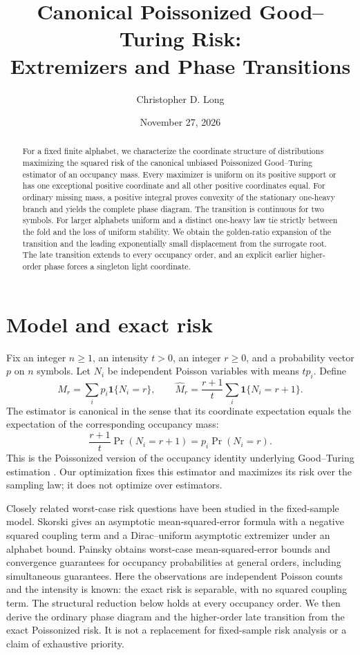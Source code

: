 \documentclass[11pt]{article}
\title{Canonical Poissonized Good--Turing Risk:\\Extremizers and Phase Transitions}
\author{Christopher D. Long}
\date{November 27, 2026}
\theoremstyle{remark}\newtheorem{remark}[theorem]{Remark}
\newcommand{\one}{\mathbf1}
\begin{document}
\maketitle
\begin{abstract}
For a fixed finite alphabet, we characterize the coordinate structure of distributions maximizing the squared risk of the canonical unbiased Poissonized Good--Turing estimator of an occupancy mass. Every maximizer is uniform on its positive support or has one exceptional positive coordinate and all other positive coordinates equal. For ordinary missing mass, a positive integral proves convexity of the stationary one-heavy branch and yields the complete phase diagram. The transition is continuous for two symbols. For larger alphabets uniform and a distinct one-heavy law tie strictly between the fold and the loss of uniform stability. We obtain the golden-ratio expansion of the transition and the leading exponentially small displacement from the surrogate root. The late transition extends to every occupancy order, and an explicit earlier higher-order phase forces a singleton light coordinate.
\end{abstract}

\section{Model and exact risk}
Fix an integer \(n\ge1\), an intensity \(t>0\), an integer \(r\ge0\), and a probability vector \(p\) on \(n\) symbols. Let \(N_i\) be independent Poisson variables with means \(tp_i\). Define
\[
M_r=\sum_i p_i\one\{N_i=r\},\qquad
\widehat M_r=\frac{r+1}{t}\sum_i\one\{N_i=r+1\}.
\]
The estimator is canonical in the sense that its coordinate expectation equals the expectation of the corresponding occupancy mass:
\[
\frac{r+1}{t}\Pr(N_i=r+1)
=p_i\Pr(N_i=r).
\]
This is the Poissonized version of the occupancy identity underlying Good--Turing estimation \cite{Good}. Our optimization fixes this estimator and maximizes its risk over the sampling law; it does not optimize over estimators.

Closely related worst-case risk questions have been studied in the fixed-sample model. Skorski \cite[Theorems 2--3]{Skorski} gives an asymptotic mean-squared-error formula with a negative squared coupling term and a Dirac--uniform asymptotic extremizer under an alphabet bound. Painsky \cite{Painsky} obtains worst-case mean-squared-error bounds and convergence guarantees for occupancy probabilities at general orders, including simultaneous guarantees. Here the observations are independent Poisson counts and the intensity is known: the exact risk is separable, with no squared coupling term. The structural reduction below holds at every occupancy order. We then derive the ordinary phase diagram and the higher-order late transition from the exact Poissonized risk. It is not a replacement for fixed-sample risk analysis or a claim of exhaustive priority.
\end{document}
